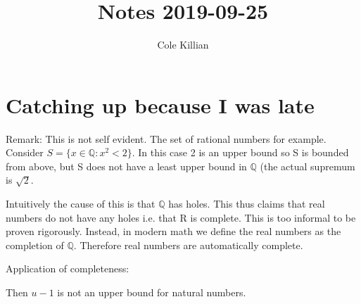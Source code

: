 \documentclass{article}
\begin{document}
\title{Notes 2019-09-25}
\author{Cole Killian}

\maketitle

\section{Catching up because I was late}


Remark: This is not self evident. The set of rational numbers for example. Consider $S = \{x \in \mathbb{Q}: x^2 < 2\}$. In this case 2 is an upper bound so S is bounded from above, but S does not have a least upper bound in  $\mathbb{Q}$ (the actual supremum is $\sqrt{2}$.

Intuitively the cause of this is that $\mathbb{Q}$ has holes. This thus claims that real numbers do not have any holes i.e. that R is complete. This is too informal to be proven rigorously. Instead, in modern math we define the real numbers as the completion of $\mathbb{Q}$. Therefore real numbers are automatically complete.

Application of completeness:



Then $u - 1$ is not an upper bound for natural numbers.
\end{document}
